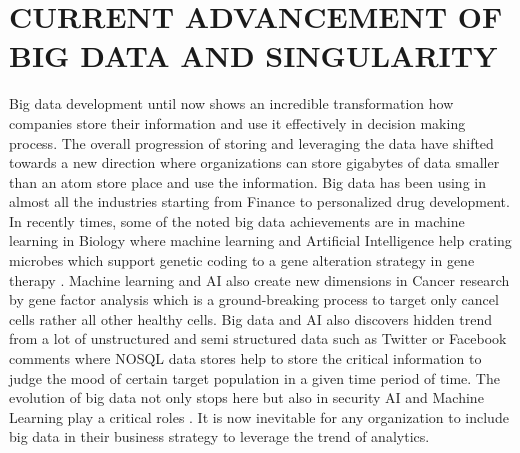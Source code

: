 \documentclass[sigconf]{acmart}
\begin{document}
\section{CURRENT ADVANCEMENT OF BIG DATA AND  SINGULARITY }
Big data development until now shows an incredible transformation how companies store their information and use it effectively in decision making process. The overall progression of storing and leveraging the data have shifted towards a new direction where organizations can store gigabytes of data smaller than an atom store place and use the information. Big data has been using in almost all the industries starting from Finance to personalized drug development.\cite{editor07} In recently times, some of the noted big data achievements are in machine learning in Biology where machine learning and Artificial Intelligence help crating microbes  which support genetic coding to a gene alteration strategy in gene therapy \cite{editor02}. Machine learning and AI also create new dimensions in Cancer research by gene factor analysis which is a ground-breaking process to target only cancel cells rather all other healthy cells. Big data and AI also discovers hidden trend from a lot of unstructured and semi structured data such as Twitter or Facebook comments where NOSQL data stores help to store the critical information to judge the mood of certain target population in a given time period of time. The evolution of big data not only stops here but also in security AI and Machine Learning play a critical roles \cite{editor02}. It is now inevitable for any organization to include big data in their business strategy to leverage the trend of analytics.
\end{document}
